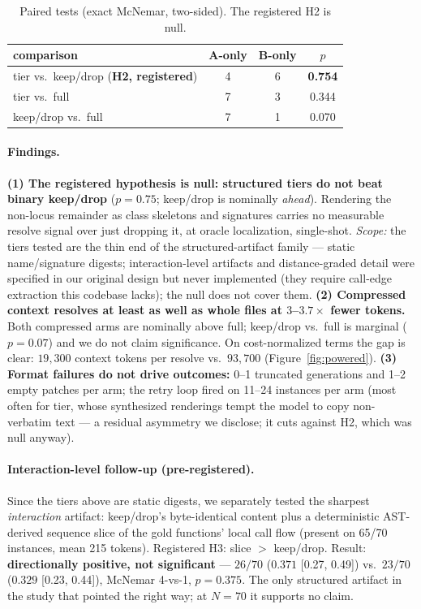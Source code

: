 \documentclass{article}
\newcommand{\ci}[2]{[#1, #2]}
\begin{document}
\begin{table}[t]
  \centering\small
  \caption{Paired tests (exact McNemar, two-sided). The registered H2 is null.}
  \label{tab:mcnemar}
  \begin{tabular}{@{}lccc@{}}
    \toprule
    comparison & A-only & B-only & $p$ \\
    \midrule
    tier vs.\ keep/drop (\textbf{H2, registered}) & 4 & 6 & \textbf{0.754} \\
    tier vs.\ full & 7 & 3 & 0.344 \\
    keep/drop vs.\ full & 7 & 1 & 0.070 \\
    \bottomrule
  \end{tabular}
\end{table}

\paragraph{Findings.}
\textbf{(1) The registered hypothesis is null: structured tiers do not beat binary keep/drop}
($p{=}0.75$; keep/drop is nominally \emph{ahead}). Rendering the non-locus remainder as class
skeletons and signatures carries no measurable resolve signal over just dropping it, at oracle
localization, single-shot. \emph{Scope:} the tiers tested are the thin end of the
structured-artifact family --- static name/signature digests; interaction-level artifacts and
distance-graded detail were specified in our original design but never implemented (they require
call-edge extraction this codebase lacks); the null does not cover them.
\textbf{(2) Compressed context resolves at least as well as whole files at $3$--$3.7\times$ fewer
tokens.} Both compressed arms are nominally above full; keep/drop vs.\ full is marginal
($p{=}0.07$) and we do not claim significance. On cost-normalized terms the gap is clear:
$19{,}300$ context tokens per resolve vs.\ $93{,}700$ (Figure~\ref{fig:powered}).
\textbf{(3) Format failures do not drive outcomes:} 0--1 truncated generations and 1--2 empty
patches per arm; the retry loop fired on 11--24 instances per arm (most often for tier, whose
synthesized renderings tempt the model to copy non-verbatim text --- a residual asymmetry we
disclose; it cuts against H2, which was null anyway).

\paragraph{Interaction-level follow-up (pre-registered).} Since the tiers above are static
digests, we separately tested the sharpest \emph{interaction} artifact: keep/drop's byte-identical
content plus a deterministic AST-derived sequence slice of the gold functions' local call flow
(present on 65/70 instances, mean 215 tokens). Registered H3: slice $>$ keep/drop. Result:
\textbf{directionally positive, not significant} --- $26/70$ ($0.371$ \ci{0.27}{0.49}) vs.\
$23/70$ ($0.329$ \ci{0.23}{0.44}), McNemar 4-vs-1, $p{=}0.375$. The only structured artifact in
the study that pointed the right way; at $N{=}70$ it supports no claim.
\end{document}
